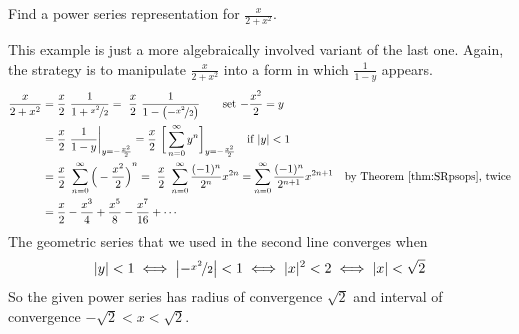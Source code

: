 \goodbreak
\begin{eg}[$\frac{x}{2+x^2}$]\label{eg:SRpsrepA}
Find a power series representation for $\frac{x}{2+x^2}$.

\soln
This example is just a more algebraically involved variant of
the last one. Again, the strategy is to manipulate $\frac{x}{2+x^2}$
into a form in which $\frac{1}{1-y}$ appears.
\begin{alignat*}{3}
\frac{x}{2+x^2} &= \frac{x}{2}\ \frac{1}{1+\nicefrac{x^2}{2}}
             =\ \frac{x}{2}\ \frac{1}{1-\big({-}\nicefrac{x^2}{2}\big)}
             \qquad \text{set $-\frac{x^2}{2}=y$} \\
             &= \frac{x}{2}\ \frac{1}{1-y}\bigg|_{y=-\frac{x^2}{2}}
             = \frac{x}{2}\ \bigg[\sum_{n=0}^\infty y^n
                                     \bigg]_{y=-\frac{x^2}{2}}
                   \quad\text{if $|y|<1$} \\
             &= \frac{x}{2}\ \sum_{n=0}^\infty {\Big(-\frac{x^2}{2}\Big)}^n
             =\ \frac{x}{2}\ \sum_{n=0}^\infty \frac{(-1)^n}{2^n}x^{2n}
             = \sum_{n=0}^\infty \frac{(-1)^n}{2^{n+1}}x^{2n+1}
                \quad\text{by Theorem \ref{thm:SRpsops}, twice} \\
             &= \frac{x}{2} - \frac{x^3}{4} + \frac{x^5}{8}-\frac{x^7}{16}
                 +\cdots
\end{alignat*}
The geometric series that we used in the second line converges when
\begin{align*}
|y|<1
\iff  \big|{-}\nicefrac{x^2}{2}\big|<1
\iff  |x|^2<2
\iff |x|<\sqrt{2}
\end{align*}
So the given power series has radius of convergence $\sqrt{2}$ and interval of
convergence $-\sqrt{2}<x<\sqrt{2}$.
\end{eg}

